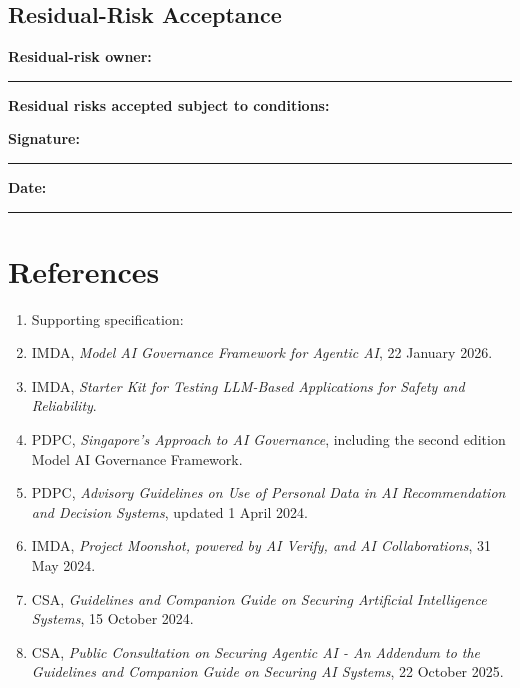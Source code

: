 \documentclass[11pt,a4paper]{article}
\begin{document}
\subsection{Residual-Risk Acceptance}

\textbf{Residual-risk owner:} \rule{7cm}{0.4pt}

\vspace{0.2cm}
\textbf{Residual risks accepted subject to conditions:}
\vspace{2.0cm}

\textbf{Signature:} \rule{5cm}{0.4pt} \hfill \textbf{Date:} \rule{3cm}{0.4pt}

\section{References}

\begin{enumerate}[leftmargin=1.2cm]
    \item Supporting specification: 
    \item IMDA, \emph{Model AI Governance Framework for Agentic AI}, 22 January 2026.
    \item IMDA, \emph{Starter Kit for Testing LLM-Based Applications for Safety and Reliability}.
    \item PDPC, \emph{Singapore's Approach to AI Governance}, including the second edition Model AI Governance Framework.
    \item PDPC, \emph{Advisory Guidelines on Use of Personal Data in AI Recommendation and Decision Systems}, updated 1 April 2024.
    \item IMDA, \emph{Project Moonshot, powered by AI Verify, and AI Collaborations}, 31 May 2024.
    \item CSA, \emph{Guidelines and Companion Guide on Securing Artificial Intelligence Systems}, 15 October 2024.
    \item CSA, \emph{Public Consultation on Securing Agentic AI - An Addendum to the Guidelines and Companion Guide on Securing AI Systems}, 22 October 2025.
\end{enumerate}
\end{document}
